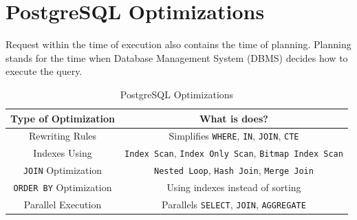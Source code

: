 \documentclass{article}
\newcommand{\code}[1]{\colorbox{light-gray}{\texttt{#1}}}
\begin{document}
\section{PostgreSQL Optimizations}

Request within the time of execution also contains the time of planning. Planning stands for the time when Database Management System (DBMS) decides how to execute the query.

\begin{table}[H]
  \centering
  \begin{tabular}{|c|c|}
    \toprule
    Type of Optimization & What is does? \\ \midrule
    Rewriting Rules & Simplifies \code{WHERE}, \code{IN}, \code{JOIN}, \code{CTE} \\ \midrule
    Indexes Using & \code{Index Scan}, \code{Index Only Scan}, \code{Bitmap Index Scan} \\ \midrule
    \code{JOIN} Optimization & \code{Nested Loop}, \code{Hash Join}, \code{Merge Join} \\ \midrule 
    \code{ORDER BY} Optimization & Using indexes instead of sorting \\ \midrule 
    Parallel Execution & Parallels \code{SELECT}, \code{JOIN}, \code{AGGREGATE} \\
    \bottomrule
  \end{tabular}
  \caption{PostgreSQL Optimizations}
\end{table}
\end{document}
